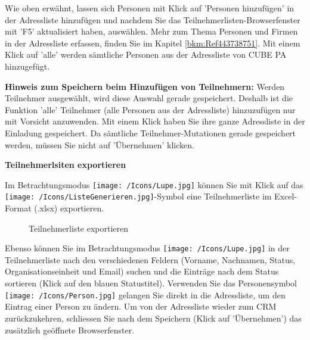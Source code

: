Wie oben erwähnt, lassen sich Personen mit Klick auf 'Personen hinzufügen'  in der Adressliste hinzufügen und nachdem Sie das Teilnehmerlisten-Browserfenster mit 'F5' aktualisiert haben, auswählen. Mehr zum Thema Personen und Firmen in der Adressliste erfassen, finden Sie im Kapitel \ref{bkm:Ref443738751}.
Mit einem Klick auf 'alle'  werden sämtliche Personen aus der Adressliste von CUBE PA hinzugefügt. 

\vspace{\baselineskip}

\textbf{Hinweis zum Speichern beim Hinzufügen von Teilnehmern:} Werden Teilnehmer ausgewählt, wird diese Auswahl gerade gespeichert. Deshalb ist die Funktion 'alle' Teilnehmer  (alle Personen aus der Adressliste) hinzuzufügen nur mit Vorsicht anzuwenden. Mit einem Klick haben Sie ihre ganze Adressliste in der Einladung gespeichert. Da sämtliche Teilnehmer-Mutationen gerade gespeichert werden, müssen Sie nicht auf 'Übernehmen' klicken.

\vspace{\baselineskip}

\textbf{Teilnehmerlsiten exportieren}

Im Betrachtungsmodus \texttt{[image: /Icons/Lupe.jpg]} können Sie mit Klick auf das \texttt{[image: /Icons/ListeGenerieren.jpg]}-Symbol  eine Teilnehmerliste im Excel-Format (.xlsx) exportieren.

\begin{figure}[H]
\caption{Teilnehmerliste exportieren}
\end{figure}

Ebenso können Sie im Betrachtungsmodus \texttt{[image: /Icons/Lupe.jpg]} in der Teilnehmerliste nach den verschiedenen Feldern (Vorname, Nachnamen, Status, Organisationseinheit und Email) suchen  und die Einträge nach dem Status sortieren  (Klick auf den blauen Statustitel). Verwenden Sie das Personensymbol \texttt{[image: /Icons/Person.jpg]}  gelangen Sie direkt in die Adressliste, um den Eintrag einer Person zu ändern. Um von der Adressliste wieder zum CRM zurückzukehren, schliessen Sie nach dem Speichern (Klick auf 'Übernehmen') das zusätzlich geöffnete Browserfenster.



